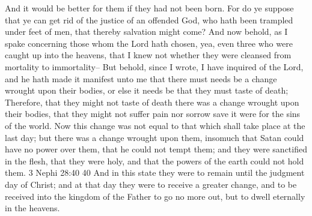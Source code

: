 \bverse \iffalse And it would be better for them if they had not been born.  For do ye suppose that ye can get rid of the justice of an offended God, who hath been trampled under feet of men, that thereby salvation might come? \fi
And it would be better for them if they had not been born.  For do ye suppose that ye can get rid of the justice of an offended God, who hath been trampled under feet of men, that thereby salvation might come?
\bverse \iffalse And now behold, as I spake concerning those whom the Lord hath chosen, yea, even three who were caught up into the heavens, that I knew not whether they were cleansed from mortality to immortality-- \fi
And now behold, as I spake concerning those whom the Lord hath chosen, yea, even three who were caught up into the heavens, that I knew not whether they were cleansed from mortality to immortality--
\bverse \iffalse But behold, since I wrote, I have inquired of the Lord, and he hath made it manifest unto me that there must needs be a change wrought upon their bodies, or else it needs be that they must taste of death; \fi
But behold, since I wrote, I have inquired of the Lord, and he hath made it manifest unto me that there must needs be a change wrought upon their bodies, or else it needs be that they must taste of death;
\bverse \iffalse Therefore, that they might not taste of death there was a change wrought upon their bodies, that they might not suffer pain nor sorrow save it were for the sins of the world. \fi
Therefore, that they might not taste of death there was a change wrought upon their bodies, that they might not suffer pain nor sorrow save it were for the sins of the world.
\bverse \iffalse Now this change was not equal to that which shall take place at the last day; but there was a change wrought upon them, insomuch that Satan could have no power over them, that he could not tempt them; and they were sanctified in the flesh, that they were holy, and that the powers of the earth could not hold them.  3 Nephi 28:40 40 And in this state they were to remain until the judgment day of Christ; and at that day they were to receive a greater change, and to be received into the kingdom of the Father to go no more out, but to dwell eternally in the heavens. \fi
Now this change was not equal to that which shall take place at the last day; but there was a change wrought upon them, insomuch that Satan could have no power over them, that he could not tempt them; and they were sanctified in the flesh, that they were holy, and that the powers of the earth could not hold them.  3 Nephi 28:40 40 And in this state they were to remain until the judgment day of Christ; and at that day they were to receive a greater change, and to be received into the kingdom of the Father to go no more out, but to dwell eternally in the heavens.
